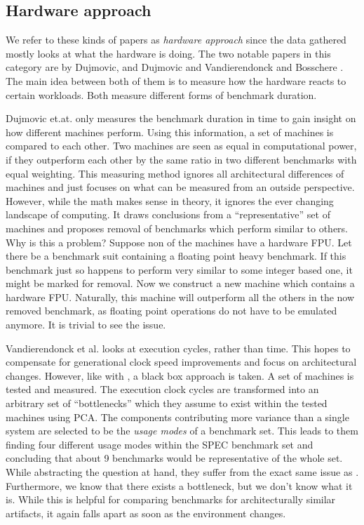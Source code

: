\documentclass[../bachelor_paper.tex]{subfiles}
\begin{document}
\subsection{Hardware approach}
	\label{ch:theory/similarity/hardware}
We refer to these kinds of papers as \textit{hardware approach} since the data gathered mostly looks at what the hardware is doing. The two notable papers in this category are by Dujmovic, and Dujmovic \cite{dujmovicEvolutionEvaluationSPEC1998} and Vandierendonck and Bosschere \cite{vandierendonckManyBenchmarksStress}. The main idea between both of them is to measure how the hardware reacts to certain workloads. Both measure different forms of benchmark duration. 

Dujmovic et.at. \cite{dujmovicEvolutionEvaluationSPEC1998} only measures the benchmark duration in time to gain insight on how different machines perform. Using this information, a set of machines is compared to each other. Two machines are seen as equal in computational power, if they outperform each other by the same ratio in two different benchmarks with equal weighting. This measuring method ignores all architectural differences of machines and just focuses on what can be measured from an outside perspective.\\
However, while the math makes sense in theory, it ignores the ever changing landscape of computing. It draws conclusions from a ``representative'' set of machines and proposes removal of benchmarks which perform similar to others. Why is this a problem? Suppose non of the machines have a hardware \ac{FPU}. Let there be a benchmark suit containing a floating point heavy benchmark. If this benchmark just so happens to perform very similar to some integer based one, it might be marked for removal. Now we construct a new machine which contains a hardware \ac{FPU}. Naturally, this machine will outperform all the others in the now removed benchmark, as floating point operations do not have to be emulated anymore. It is trivial to see the issue.

Vandierendonck et al. \cite{vandierendonckManyBenchmarksStress} looks at execution cycles, rather than time. This hopes to compensate for generational clock speed improvements and focus on architectural changes. However, like with \cite{dujmovicEvolutionEvaluationSPEC1998}, a black box approach is taken. A set of machines is tested and measured. The execution clock cycles are transformed into an arbitrary set of ``bottlenecks'' which they assume to exist within the tested machines using \ac{PCA}. The components contributing more variance than a single system are selected to be the \textit{usage modes} of a benchmark set. This leads to them finding four different usage modes within the \ac{SPEC} benchmark set and concluding that about 9 benchmarks would be representative of the whole set.\\
While abstracting the question at hand, they suffer from the exact same issue as \cite{dujmovicEvolutionEvaluationSPEC1998}. Furthermore, we know that there exists a bottleneck, but we don't know what it is. While this is helpful for comparing benchmarks for architecturally similar artifacts, it again falls apart as soon as the environment changes.
\end{document}
